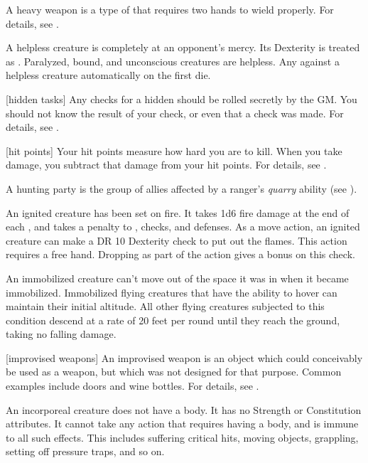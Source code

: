  A heavy weapon is a type of  that requires two hands to wield properly.
For details, see .

 A helpless creature is completely at an opponent's mercy.
Its Dexterity is treated as .
Paralyzed, bound, and unconscious creatures are helpless.
Any  against a helpless creature automatically  on the first die.

[hidden tasks] Any checks for a hidden  should be rolled secretly by the GM.\@
You should not know the result of your check, or even that a check was made.
For details, see .

[hit points] Your hit points measure how hard you are to kill.
When you take damage, you subtract that damage from your hit points.
For details, see .

 A hunting party is the group of allies affected by a ranger's \textit{quarry} ability (see ).

 An ignited creature has been set on fire.
It takes 1d6 fire damage at the end of each , and takes a  penalty to , checks, and defenses.
As a move action, an ignited creature can make a DR 10 Dexterity check to put out the flames.
This action requires a free hand.
Dropping  as part of the action gives a  bonus on this check.

 An immobilized creature can't move out of the space it was in when it became immobilized. Immobilized flying creatures that have the ability to hover can maintain their initial altitude. All other flying creatures subjected to this condition descend at a rate of 20 feet per round until they reach the ground, taking no falling damage.

[improvised weapons] An improvised weapon is an object which could conceivably be used as a weapon, but which was not designed for that purpose.
Common examples include doors and wine bottles.
For details, see .

 An incorporeal creature does not have a body.
It has no Strength or Constitution attributes.
It cannot take any action that requires having a body, and is immune to all such effects.
This includes suffering critical hits, moving objects, grappling, setting off pressure traps, and so on.

